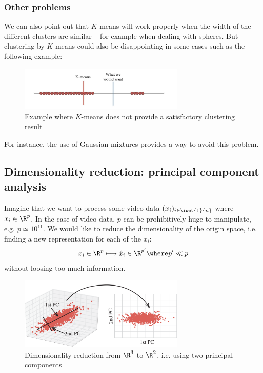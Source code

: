 \documentclass[toc, titlepaged]{../cs-classes/cs-classes}
\begin{document}
\subsubsection{Other problems}
We can also point out that $K$-means will work properly when the width of the different clusters are similar -- for example when dealing with spheres. But clustering by $K$-means could also be disappointing in some cases such as the following example:
\begin{figure}[H]
    \centering
    \includegraphics[width=0.7\textwidth]{images/k-means-limitations.png}
    \caption{Example where $K$-means does not provide a satisfactory clustering result}
\end{figure}
For instance, the use of Gaussian mixtures provides a way to avoid this problem.

\subsection{Dimensionality reduction: principal component analysis}
Imagine that we want to process some video data $(x_i)_{i\in\iset{1}{n}}$ where $x_i\in\R^p$. In the case of video data, $p$ can be prohibitively huge to manipulate, e.g. $p\simeq10^{11}$. We would like to reduce the dimensionality of the origin space, i.e. finding a new representation for each of the $x_i$:
\begin{equation*}
    x_i\in\R^p \longmapsto \hat{x}_i\in\R^{p'} \where p' \ll p
\end{equation*}
without loosing too much information.

\begin{figure}[H]
    \centering
    \includegraphics[width=0.7\textwidth]{images/dimensionality-reduction.png}
    \caption{Dimensionality reduction from $\R^3$ to $\R^2$, i.e. using two principal components}
\end{figure}
\end{document}
